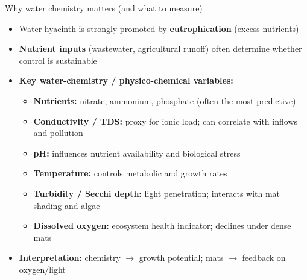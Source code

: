 \begin{frame}{Why water chemistry matters (and what to measure)}
\begin{itemize}
  \item Water hyacinth is strongly promoted by \textbf{eutrophication} (excess nutrients)
  \item \textbf{Nutrient inputs} (wastewater, agricultural runoff) often determine whether control is sustainable
  \item \textbf{Key water-chemistry / physico-chemical variables:}
    \begin{itemize}
      \item \textbf{Nutrients:} nitrate, ammonium, phosphate (often the most predictive)
      \item \textbf{Conductivity / TDS:} proxy for ionic load; can correlate with inflows and pollution
      \item \textbf{pH:} influences nutrient availability and biological stress
      \item \textbf{Temperature:} controls metabolic and growth rates
      \item \textbf{Turbidity / Secchi depth:} light penetration; interacts with mat shading and algae
      \item \textbf{Dissolved oxygen:} ecosystem health indicator; declines under dense mats
    \end{itemize}
  \item \textbf{Interpretation:} chemistry $\rightarrow$ growth potential; mats $\rightarrow$ feedback on oxygen/light
\end{itemize}
\end{frame}

